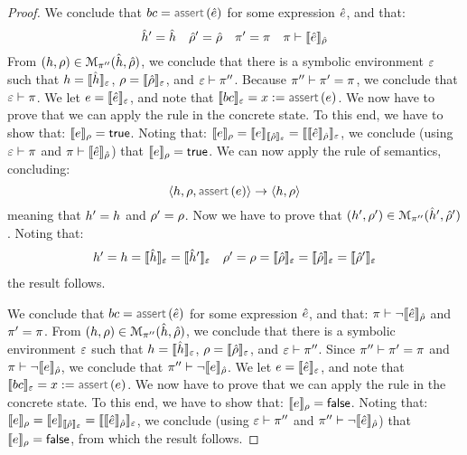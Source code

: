 \begin{proof}
\noindent{}
We conclude that  $\bcmd = \assert(\sexpr)$ for some expression $\sexpr$, and that: 
$$
  \sheap' = \sheap 
  \quad
  \sstore' =  \sstore 
  \quad
  \pc' = \pc
  \quad
  \pc \vdash  \symbeval{\sexpr}{\sstore}
$$ 
From $(\heap, \store) \in \smodels{\sheap, \sstore}{\pc''}$, we conclude that there is a symbolic environment
$\senv$ such that $\heap = \semexpr{\sheap}{\senv}$, $\store = \semexpr{\sstore}{\senv}$, and 
$\senv \vdash \pc''$. Because $\pc'' \vdash \pc' = \pc$, we conclude that $\senv \vdash \pc$. 
We let $\jsilexpr = \symbeval{\sexpr}{\senv}$, and note that $\symbeval{\bcmd}{\senv} = \jvar := \assert(\jsilexpr)$.
We now have to prove that we can apply the  rule in the concrete state.
To this end, we have to show that: $\symbeval{\jsilexpr}{\store} = \jtrue$. 
Noting that:
$
  \symbeval{\jsilexpr}{\store} = \symbeval{\jsilexpr}{\symbeval{\sstore}{\senv}} 
         = \symbeval{\symbeval{\sexpr}{\sstore}}{\senv} 
$, we conclude (using $\senv \vdash \pc$ and $\pc \vdash  \symbeval{\sexpr}{\sstore}$) that 
$\symbeval{\jsilexpr}{\store} = \jtrue$. 
We can now apply the  rule of \jsil semantics, concluding: 
$$
   \semtrans{\heap, \store, \assert(\jsilexpr)}{\heap,  \store}
$$
meaning that $\heap' = \heap$ and $\store' = \store$. 
%
Now we have to prove that $(\heap', \store') \in \smodels{\sheap', \sstore'}{\pc''}$.
Noting that:
$$
\begin{array}{l}
\heap' = \heap = \semexpr{\sheap}{\senv} = \semexpr{\sheap'}{\senv}
 \quad 
 \store' = \store = \symbeval{\sstore}{\senv} = \symbeval{\sstore}{\senv} = \symbeval{\sstore'}{\senv} 
\end{array}
$$
the result follows. 
\vspace{6pt}

\noindent{}
We conclude that  $\bcmd = \assert(\sexpr)$ for some expression $\sexpr$, and that: 
$\pc \vdash \neg\symbeval{\sexpr}{\sstore}$ and $\pc' = \pc$. 
From $(\heap, \store) \in \smodels{\sheap, \sstore}{\pc''}$, we conclude that there is a symbolic environment
$\senv$ such that $\heap = \semexpr{\sheap}{\senv}$, $\store = \semexpr{\sstore}{\senv}$, and 
$\senv \vdash \pc''$. Since $\pc'' \vdash \pc' = \pc$ and  $\pc \vdash \neg\symbeval{\jsilexpr}{\sstore}$, 
we conclude that $\pc'' \vdash \neg\symbeval{\jsilexpr}{\sstore}$.
We let $\jsilexpr = \symbeval{\sexpr}{\senv}$, and note that $\symbeval{\bcmd}{\senv} = \jvar := \assert(\jsilexpr)$.
We now have to prove that we can apply the  rule in the concrete state.
To this end, we have to show that: $\symbeval{\jsilexpr}{\store} = \jfalse$. 
Noting that:
$
  \symbeval{\jsilexpr}{\store} = \symbeval{\jsilexpr}{\symbeval{\sstore}{\senv}} 
         = \symbeval{\symbeval{\sexpr}{\sstore}}{\senv} 
$, we conclude (using $\senv \vdash \pc''$ and $\pc'' \vdash  \neg\symbeval{\sexpr}{\sstore}$) that 
$\symbeval{\jsilexpr}{\store} = \jfalse$, from which the result follows. 
\end{proof}

